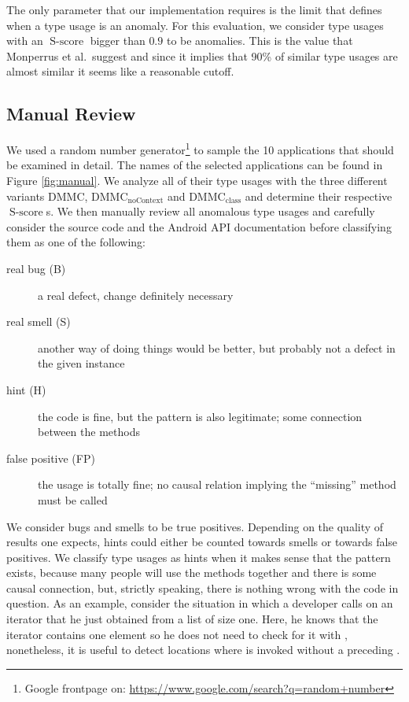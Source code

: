 The only parameter that our implementation requires is the limit that defines when a type usage is an anomaly.
For this evaluation, we consider type usages with an $\operatorname{S-score}$ bigger than $0.9$ to be anomalies.
This is the value that Monperrus et al.\ suggest and since it implies that 90\% of similar type usages are almost similar it seems like a reasonable cutoff.

\subsection{Manual Review}

We used a random number generator\footnote{Google frontpage on: \url{https://www.google.com/search?q=random+number}} to sample the 10 applications that should be examined in detail.
The names of the selected applications can be found in Figure \ref{fig:manual}.
We analyze all of their type usages with the three different variants $\text{DMMC}$, $\text{DMMC}_{\text{noContext}}$ and $\text{DMMC}_{\text{class}}$ and determine their respective $\operatorname{S-score}$s.
We then manually review all anomalous type usages and carefully consider the source code and the Android API documentation before classifying them as one of the following:
\begin{description}
    \item [real bug (B)] a real defect, change definitely necessary
    \item [real smell (S)] another way of doing things would be better, but probably not a defect in the given instance
    \item [hint (H)] the code is fine, but the pattern is also legitimate; some connection between the methods
    \item [false positive (FP)] the usage is totally fine; no causal relation implying the ``missing'' method must be called
\end{description}


We consider bugs and smells to be true positives.
Depending on the quality of results one expects, hints could either be counted towards smells or towards false positives.
We classify type usages as hints when it makes sense that the pattern exists, because many people will use the methods together and there is some causal connection, but, strictly speaking, there is nothing wrong with the code in question.
As an example, consider the situation in which a developer calls  on an iterator that he just obtained from a list of size one.
Here, he knows that the iterator contains one element so he does not need to check for it with , nonetheless, it is useful to detect locations where  is invoked without a preceding .

